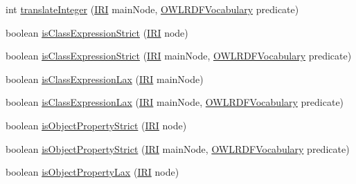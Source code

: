 \begin{DoxyCompactItemize}
\item 
int \hyperlink{classorg_1_1coode_1_1owlapi_1_1rdfxml_1_1parser_1_1_abstract_triple_handler_a3c871a2ac8e4fdac6e937965fbb5c23f}{translate\-Integer} (\hyperlink{classorg_1_1semanticweb_1_1owlapi_1_1model_1_1_i_r_i}{I\-R\-I} main\-Node, \hyperlink{enumorg_1_1semanticweb_1_1owlapi_1_1vocab_1_1_o_w_l_r_d_f_vocabulary}{O\-W\-L\-R\-D\-F\-Vocabulary} predicate)
\item 
boolean \hyperlink{classorg_1_1coode_1_1owlapi_1_1rdfxml_1_1parser_1_1_abstract_triple_handler_a3ccfe20c11c7aabea59a0c6a4621daa9}{is\-Class\-Expression\-Strict} (\hyperlink{classorg_1_1semanticweb_1_1owlapi_1_1model_1_1_i_r_i}{I\-R\-I} node)
\item 
boolean \hyperlink{classorg_1_1coode_1_1owlapi_1_1rdfxml_1_1parser_1_1_abstract_triple_handler_a39d64eab8f43b9fee08beb0bd2fbf0c0}{is\-Class\-Expression\-Strict} (\hyperlink{classorg_1_1semanticweb_1_1owlapi_1_1model_1_1_i_r_i}{I\-R\-I} main\-Node, \hyperlink{enumorg_1_1semanticweb_1_1owlapi_1_1vocab_1_1_o_w_l_r_d_f_vocabulary}{O\-W\-L\-R\-D\-F\-Vocabulary} predicate)
\item 
boolean \hyperlink{classorg_1_1coode_1_1owlapi_1_1rdfxml_1_1parser_1_1_abstract_triple_handler_a1283cdf405389a68c71da939bee1a467}{is\-Class\-Expression\-Lax} (\hyperlink{classorg_1_1semanticweb_1_1owlapi_1_1model_1_1_i_r_i}{I\-R\-I} main\-Node)
\item 
boolean \hyperlink{classorg_1_1coode_1_1owlapi_1_1rdfxml_1_1parser_1_1_abstract_triple_handler_a51187e71e0fb5789a5d7562667e172e3}{is\-Class\-Expression\-Lax} (\hyperlink{classorg_1_1semanticweb_1_1owlapi_1_1model_1_1_i_r_i}{I\-R\-I} main\-Node, \hyperlink{enumorg_1_1semanticweb_1_1owlapi_1_1vocab_1_1_o_w_l_r_d_f_vocabulary}{O\-W\-L\-R\-D\-F\-Vocabulary} predicate)
\item 
boolean \hyperlink{classorg_1_1coode_1_1owlapi_1_1rdfxml_1_1parser_1_1_abstract_triple_handler_a0189fe7015965ac612ddda3d40211073}{is\-Object\-Property\-Strict} (\hyperlink{classorg_1_1semanticweb_1_1owlapi_1_1model_1_1_i_r_i}{I\-R\-I} node)
\item 
boolean \hyperlink{classorg_1_1coode_1_1owlapi_1_1rdfxml_1_1parser_1_1_abstract_triple_handler_ad57a0e128439e36d482fe58ee4c769e5}{is\-Object\-Property\-Strict} (\hyperlink{classorg_1_1semanticweb_1_1owlapi_1_1model_1_1_i_r_i}{I\-R\-I} main\-Node, \hyperlink{enumorg_1_1semanticweb_1_1owlapi_1_1vocab_1_1_o_w_l_r_d_f_vocabulary}{O\-W\-L\-R\-D\-F\-Vocabulary} predicate)
\item 
boolean \hyperlink{classorg_1_1coode_1_1owlapi_1_1rdfxml_1_1parser_1_1_abstract_triple_handler_a675be69c029c75905eb573db0ba72fb6}{is\-Object\-Property\-Lax} (\hyperlink{classorg_1_1semanticweb_1_1owlapi_1_1model_1_1_i_r_i}{I\-R\-I} node)

\end{DoxyCompactItemize}
